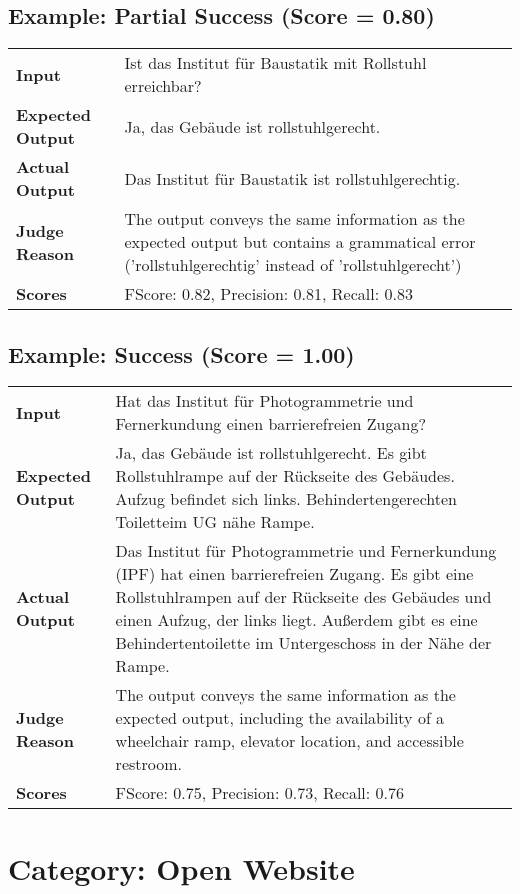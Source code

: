 \documentclass{article}
\begin{document}
\subsection*{Example: Partial Success (Score = 0.80)}
\begin{longtable}{p{} p{}}
\textbf{Input} & Ist das Institut für Baustatik mit Rollstuhl erreichbar? \\
\textbf{Expected Output} & Ja, das Gebäude ist rollstuhlgerecht. \\
\textbf{Actual Output} & Das Institut für Baustatik ist rollstuhlgerechtig. \\
\textbf{Judge Reason} & The output conveys the same information as the expected output but contains a grammatical error ('rollstuhlgerechtig' instead of 'rollstuhlgerecht') \\
\textbf{Scores} & FScore: 0.82, Precision: 0.81, Recall: 0.83 \\
\end{longtable}
\subsection*{Example: Success (Score = 1.00)}
\begin{longtable}{p{} p{}}
\textbf{Input} & Hat das Institut für Photogrammetrie und Fernerkundung einen barrierefreien Zugang? \\
\textbf{Expected Output} & Ja, das Gebäude ist rollstuhlgerecht. Es gibt Rollstuhlrampe auf der Rückseite des Gebäudes. Aufzug befindet sich links. Behindertengerechten Toiletteim UG nähe Rampe. \\
\textbf{Actual Output} & Das Institut für Photogrammetrie und Fernerkundung (IPF) hat einen barrierefreien Zugang. Es gibt eine Rollstuhlrampen auf der Rückseite des Gebäudes und einen Aufzug, der links liegt. Außerdem gibt es eine Behindertentoilette im Untergeschoss in der Nähe der Rampe. \\
\textbf{Judge Reason} & The output conveys the same information as the expected output, including the availability of a wheelchair ramp, elevator location, and accessible restroom. \\
\textbf{Scores} & FScore: 0.75, Precision: 0.73, Recall: 0.76 \\
\end{longtable}
\section*{Category: Open Website}
\end{document}
